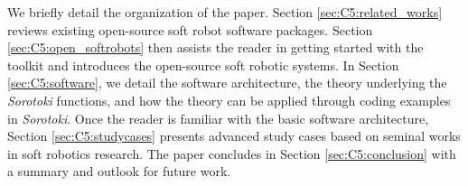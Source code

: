 We briefly detail the organization of the paper. Section \ref{sec:C5:related_works} reviews existing open-source soft robot software packages. Section \ref{sec:C5:open_softrobots} then assists the reader in getting started with the toolkit and introduces the open-source soft robotic systems. In Section \ref{sec:C5:software}, we detail the software architecture, the theory underlying the \textit{Sorotoki} functions, and how the theory can be applied through coding examples in \textit{Sorotoki}. Once the reader is familiar with the basic software architecture, Section \ref{sec:C5:studycases} presents advanced study cases based on seminal works in soft robotics research. The paper concludes in Section \ref{sec:C5:conclusion} with a summary and outlook for future work.
